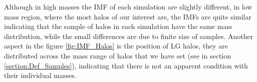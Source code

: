 \documentclass[usenatbib]{latex/mn2e}
\begin{document}
Although in high masses the IMF of each simulation are slightly different, 
in low mass region, where the most halos of our interest are, the IMFs are 
quite similar indicating that the sample of halos in each simulation have 
the same mass distribution, while the small differences are due to finite 
size of samples. Another aspect in the figure \ref{fig:IMF_Halos} is the 
position of LG halos, they are distributed across the mass range of halos 
that we have set (see in section \ref{section:Def_Samples}), indicating 
that there is not an apparent condition with their individual masses.


\begin{flushleft}
\begin{center}


\end{center}
\end{flushleft}
\end{document}
